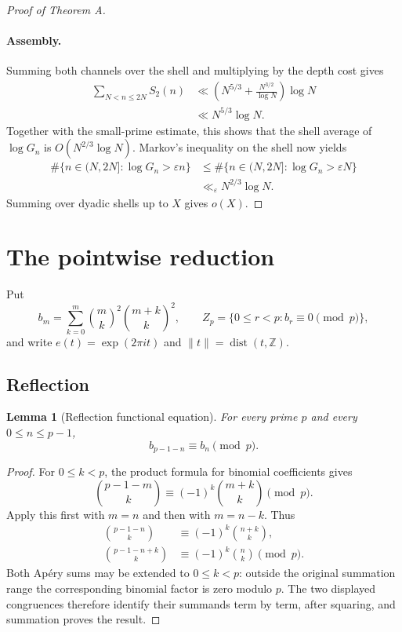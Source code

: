\documentclass[11pt]{amsart}
\newcommand{\Z}{\mathbb{Z}}
\theoremstyle{plain}
\newtheorem{lemma}{Lemma}
\theoremstyle{remark}
\begin{document}
\begin{proof}[Proof of Theorem A]
\paragraph{Assembly.}
Summing both channels over the shell and multiplying by the depth cost
gives
\begin{align*}
 \sum_{N<n\leq2N}S_2(n)
 &\ll\left(N^{5/3}+\frac{N^{3/2}}{\log N}\right)\log N\\
 &\ll N^{5/3}\log N.
\end{align*}
Together with the small-prime estimate, this shows that the shell average
of $\log G_n$ is $O(N^{2/3}\log N)$.  Markov's inequality on the shell
now yields
\begin{align*}
 \#\{n\in(N,2N]:\log G_n>\varepsilon n\}
 &\leq\#\{n\in(N,2N]:\log G_n>\varepsilon N\}\\
 &\ll_{\varepsilon}N^{2/3}\log N.
\end{align*}
Summing over dyadic shells up to $X$ gives $o(X)$.
\end{proof}

\section{The pointwise reduction}\label{sec:pointwise}

Put
\[
 b_m=\sum_{k=0}^m\binom mk^2\binom{m+k}k^2,
 \qquad
 Z_p=\{0\leq r<p:b_r\equiv0\pmod p\},
\]
and write $e(t)=\exp(2\pi i t)$ and $\|t\|=\operatorname{dist}(t,\Z)$.

\subsection{Reflection}

\begin{lemma}[Reflection functional equation]\label{lem:reflection}
For every prime $p$ and every $0\leq n\leq p-1$,
\[
 b_{p-1-n}\equiv b_n\pmod p.
\]
\end{lemma}

\begin{proof}
For $0\leq k<p$, the product formula for binomial coefficients gives
\[
 \binom{p-1-m}{k}
 \equiv(-1)^k\binom{m+k}{k}\pmod p.
\]
Apply this first with $m=n$ and then with $m=n-k$.  Thus
\[
 \begin{aligned}
 \binom{p-1-n}{k}&\equiv(-1)^k\binom{n+k}{k},\\
 \binom{p-1-n+k}{k}&\equiv(-1)^k\binom nk\pmod p.
 \end{aligned}
\]
Both Ap\'ery sums may be extended to $0\leq k<p$: outside the original
summation range the corresponding binomial factor is zero modulo $p$.
The two displayed congruences therefore identify their summands term by
term, after squaring, and summation proves the result.
\end{proof}
\end{document}
